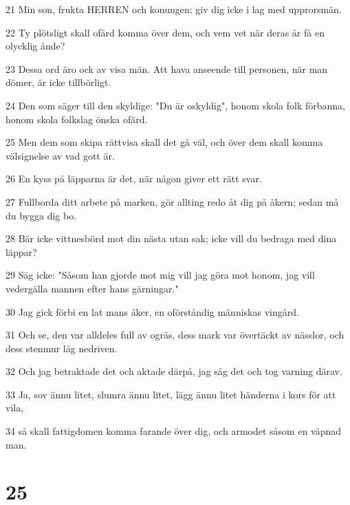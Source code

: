 \par 21 Min son, frukta HERREN och konungen; giv dig icke i lag med upprorsmän.
\par 22 Ty plötsligt skall ofärd komma över dem, och vem vet när deras år få en olycklig ände?
\par 23 Dessa ord äro ock av visa män. Att hava anseende till personen, när man dömer, är icke tillbörligt.
\par 24 Den som säger till den skyldige: "Du är oskyldig", honom skola folk förbanna, honom skola folkslag önska ofärd.
\par 25 Men dem som skipa rättvisa skall det gå väl, och över dem skall komma välsignelse av vad gott är.
\par 26 En kyss på läpparna är det, när någon giver ett rätt svar.
\par 27 Fullborda ditt arbete på marken, gör allting redo åt dig på åkern; sedan må du bygga dig bo.
\par 28 Bär icke vittnesbörd mot din nästa utan sak; icke vill du bedraga med dina läppar?
\par 29 Säg icke: "Såsom han gjorde mot mig vill jag göra mot honom, jag vill vedergälla mannen efter hans gärningar."
\par 30 Jag gick förbi en lat mans åker, en oförståndig människas vingård.
\par 31 Och se, den var alldeles full av ogräs, dess mark var övertäckt av nässlor, och dess stenmur låg nedriven.
\par 32 Och jag betraktade det och aktade därpå, jag såg det och tog varning därav.
\par 33 Ja, sov ännu litet, slumra ännu litet, lägg ännu litet händerna i kors för att vila,
\par 34 så skall fattigdomen komma farande över dig, och armodet såsom en väpnad man.

\chapter{25}


